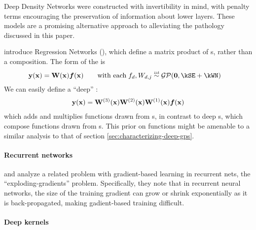 Deep Density Networks \citep{rippel2013high} were constructed with invertibility in mind, with penalty terms encouraging the preservation of information about lower layers.
These models are a promising alternative approach to alleviating the pathology discussed in this paper.

\citet{wilson2012gaussian} introduce \gp{} Regression Networks (\gprn{}), which define a matrix product of \gp{}s, rather than a composition.
The form of the \gprn{} is
%
\begin{align}
\vy(\vx) & = \vW(\vx) \vf(\vx) \qquad \textnormal{with each} \; f_{d}, W_{d,j} \simiid \GPt{\vzero}{\kSE + \kWN}
\end{align}
%
We can easily define a ``deep'' \gprn{}:
%
\begin{align}
{\bf{y}}({\bf{x}}) = \mathbf{W}^{(3)}({\bf{x}}) \mathbf{W}^{(2)}({\bf{x}}) \mathbf{W}^{(1)}({\bf{x}}) \boldsymbol{f}({\bf{x}})
\end{align}
%
which adds and multiplies functions drawn from \gp{}s, in contrast to deep \gp{}s, which compose functions drawn from \gp{}s.
This prior on functions might be amenable to a similar analysis to that of section \ref{sec:characterizing-deep-gps}.

%
%
%




\paragraph{Recurrent networks}
\cite{bengio1994learning} and \cite{pascanu2012understanding} analyze a related problem with gradient-based learning in recurrent nets, the ``exploding-gradients'' problem.
Specifically, they note that in recurrent neural networks, the size of the training gradient can grow or shrink exponentially as it is back-propagated, making gadient-based training difficult.

\paragraph{Deep kernels}


